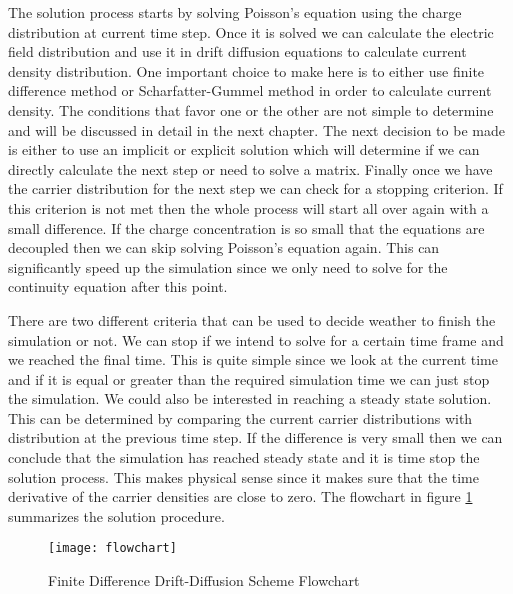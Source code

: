 The solution process starts by solving Poisson's equation using the charge distribution at current time step. Once it is solved we can calculate the electric field distribution and use it in drift diffusion equations to calculate current density distribution. One important choice to make here is to either use finite difference method or Scharfatter-Gummel method in order to calculate current density. The conditions that favor one or the other are not simple to determine and will be discussed in detail in the next chapter. The next decision to be made is either to use an implicit or explicit solution which will determine if we can directly calculate the next step or need to solve a matrix. Finally once we have the carrier distribution for the next step we can check for a stopping criterion. If this criterion is not met then the whole process will start all over again with a small difference. If the charge concentration is so small that the equations are decoupled then we can skip solving Poisson's equation again. This can significantly speed up the simulation since we only need to solve for the continuity equation after this point.

 There are two different criteria that can be used to decide weather to finish the simulation or not. We can stop if we intend to solve for a certain time frame and we reached the final time. This is quite simple since we look at the current time and if it is equal or greater than the required simulation time we can just stop the simulation. We could also be interested in reaching a steady state solution. This can be determined by comparing the current carrier distributions with distribution at the previous time step. If the difference is very small then we can conclude that the simulation has reached steady state and it is time stop the solution process. This makes physical sense since it makes sure that the time derivative of the carrier densities are close to zero. The flowchart in figure \ref{flowchart} summarizes the solution procedure.


\clearpage

\begin{figure}
\centering
\texttt{[image: flowchart]}
\caption{Finite Difference Drift-Diffusion Scheme Flowchart} 
\label{flowchart}
\end{figure}
